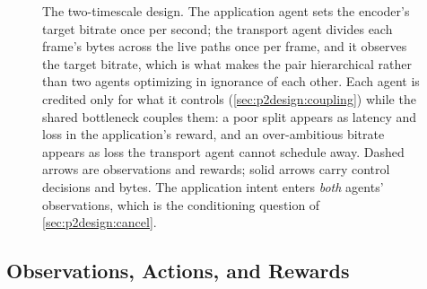 \begin{figure}[t]
  \caption[The two-timescale design]{The two-timescale design. The application agent sets the encoder's target bitrate once per
  second; the transport agent divides each frame's bytes across the live paths once per frame, and it
  observes the target bitrate, which is what makes the pair hierarchical rather than two agents
  optimizing in ignorance of each other. Each agent is credited only for what it controls
  (\cref{sec:p2design:coupling}) while the shared bottleneck couples them: a poor split appears as
  latency and loss in the application's reward, and an over-ambitious bitrate appears as loss the
  transport agent cannot schedule away. Dashed arrows are observations and rewards; solid arrows carry
  control decisions and bytes. The application intent enters \emph{both} agents' observations, which is
  the conditioning question of \cref{sec:p2design:cancel}.}
  \label{fig:p2design:arch}
\end{figure}

\subsection{Observations, Actions, and Rewards}
\label{sec:p2design:mdp}

